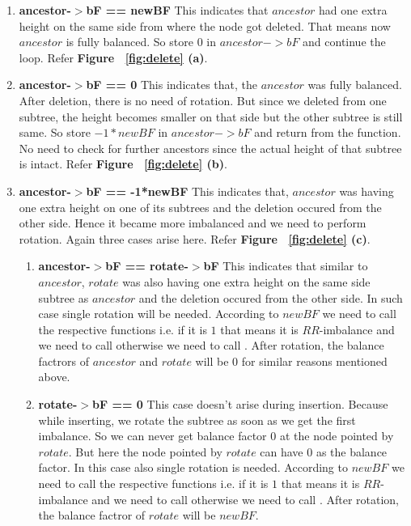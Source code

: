 \documentclass{article}
\begin{document}
\begin{enumerate}
\item \textbf{ancestor-$>$bF == newBF}\newline
This indicates that $ancestor$ had one extra height on the same side from where the node got deleted. That means now $ancestor$ is fully balanced. So store $0$ in $ancestor->bF$ and continue the loop. Refer \textbf{Figure ~\ref{fig:delete} (a)}.
\item \textbf{ancestor-$>$bF == 0}\newline
This indicates that, the $ancestor$ was fully balanced. After deletion, there is no need of rotation. But since we deleted from one subtree, the height becomes smaller on that side but the other subtree is still same. So store $-1*newBF$ in $ancestor->bF$ and return from the function. No need to check for further ancestors since the actual height of that subtree is intact. Refer \textbf{Figure ~\ref{fig:delete} (b)}.
\item \textbf{ancestor-$>$bF == -1*newBF}\newline
This indicates that, $ancestor$ was having one extra height on one of its subtrees and the deletion occured from the other side. Hence it became more imbalanced and we need to perform rotation. Again three cases arise here. Refer \textbf{Figure ~\ref{fig:delete} (c)}.
\begin{enumerate}
\item \textbf{ancestor-$>$bF == rotate-$>$bF}\newline
This indicates that similar to $ancestor$, $rotate$ was also having one extra height on the same side subtree as $ancestor$ and the deletion occured from the other side. In such case single rotation will be needed. According to $newBF$ we need to call the respective functions i.e. if it is $1$ that means it is $RR$-imbalance and we need to call  otherwise we need to call . After rotation, the balance factrors of $ancestor$ and $rotate$ will be $0$ for similar reasons mentioned above.
\item \textbf{rotate-$>$bF == 0}\newline
This case doesn't arise during insertion. Because while inserting, we rotate the subtree as soon as we get the first imbalance. So we can never get balance factor $0$ at the node pointed by $rotate$. But here the node pointed by $rotate$ can have $0$ as the balance factor. In this case also single rotation is needed. According to $newBF$ we need to call the respective functions i.e. if it is $1$ that means it is $RR$-imbalance and we need to call  otherwise we need to call . After rotation, the balance factror of $rotate$ will be $newBF$.

\end{enumerate}
\end{enumerate}
\end{document}
